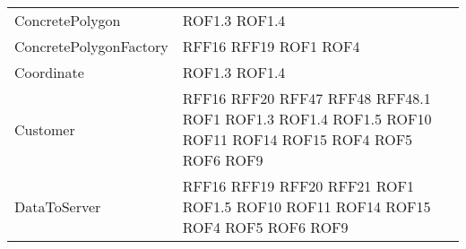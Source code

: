 \begin{longtable}{p{5cm}!{\VRule[1pt]}p{2.5cm}}
	ConcretePolygon & ROF1.3 \newline ROF1.4\\
	ConcretePolygonFactory & RFF16 \newline RFF19 \newline ROF1 \newline ROF4\\
	Coordinate & ROF1.3 \newline ROF1.4\\
	Customer & RFF16 \newline RFF20 \newline RFF47 \newline RFF48 \newline RFF48.1 \newline ROF1 \newline ROF1.3 \newline ROF1.4 \newline ROF1.5 \newline ROF10 \newline ROF11 \newline ROF14 \newline ROF15 \newline ROF4 \newline ROF5 \newline ROF6 \newline ROF9\\
	DataToServer & RFF16 \newline RFF19 \newline RFF20 \newline RFF21 \newline ROF1 \newline ROF1.5 \newline ROF10 \newline ROF11 \newline ROF14 \newline ROF15 \newline ROF4 \newline ROF5 \newline ROF6 \newline ROF9\\

\end{longtable}
